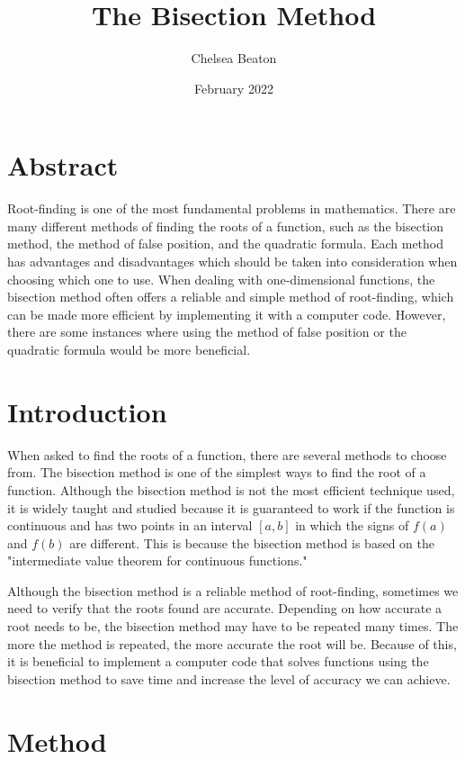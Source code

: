 \documentclass{article}
\title{The Bisection Method}
\author{Chelsea Beaton}
\date{February 2022}
\begin{document}
\maketitle

\section{Abstract}
Root-finding is one of the most fundamental problems in mathematics. There are many different methods of finding the roots of a function, such as the bisection method, the method of false position, and the quadratic formula. Each method has advantages and disadvantages which should be taken into consideration when choosing which one to use. When dealing with one-dimensional functions, the bisection method often offers a reliable and simple method of root-finding, which can be made more efficient by implementing it with a computer code. However, there are some instances where using the method of false position or the quadratic formula would be more beneficial. 



\section{Introduction}
When asked to find the roots of a function, there are several methods to choose from. The bisection method is one of the simplest ways to find the root of a function. Although the bisection method is not the most efficient technique used, it is widely taught and studied because it is guaranteed to work if the function is continuous and has two points in an interval $[a,b]$ in which the signs of $f(a)$ and $f(b)$ are different. This is because the bisection method is based on the "intermediate value theorem for continuous functions."\cite{byjus}

\par Although the bisection method is a reliable method of root-finding, sometimes we need to verify that the roots found are accurate. Depending on how accurate a root needs to be, the bisection method may have to be repeated many times. The more the method is repeated, the more accurate the root will be. Because of this, it is beneficial to implement a computer code that solves functions using the bisection method to save time and increase the level of accuracy we can achieve. 



\section{Method}
\end{document}
